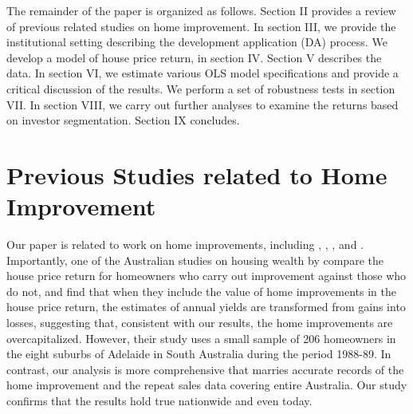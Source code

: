 \documentclass[AEJ,reqno, draftmode]{AEA} %
\begin{document}
The remainder of the paper is organized as follows. Section II provides a review of previous related studies on home improvement. In section III, we provide the institutional setting describing the development application (DA) process. We develop a model of house price return, in section IV. Section V describes the data. In section VI, we estimate various OLS model specifications and provide a critical discussion of the results. We perform a set of robustness tests in section VII. In section VIII, we carry out further analyses to examine the returns based on investor segmentation. Section IX concludes.



\section{Previous Studies related to Home Improvement}

Our paper is related to work on home improvements, including \cite{badcock1994snakes}, \cite{choi2014speculating}, \cite{gyourko2004reinvestment}, \cite{helms2003understanding} and \cite{montgomery1992explaining}. Importantly, one of the Australian studies on housing wealth by \cite{badcock1994snakes} compare the house price return for homeowners who carry out improvement against those who do not, and find that when they include the value of home improvements in the house price return, the estimates of annual yields are transformed from gains into losses, suggesting that, consistent with our results, the home improvements are overcapitalized. However, their study uses a small sample of 206 homeowners in the eight suburbs of Adelaide in South Australia during the period 1988-89. In contrast, our analysis is more comprehensive that marries accurate records of the home improvement and the repeat sales data covering entire Australia. Our study confirms that the results hold true nationwide and even today.
\end{document}
